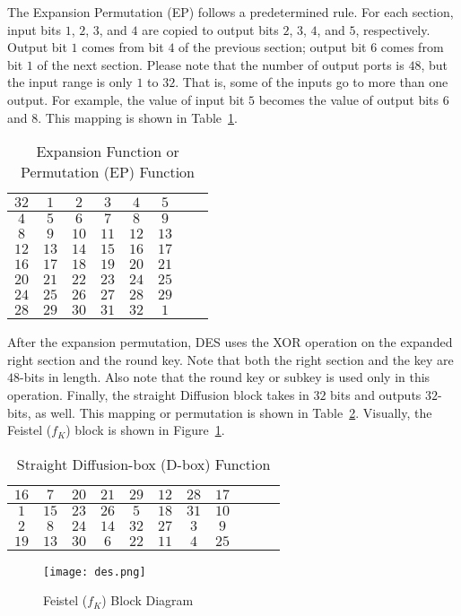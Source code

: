 \documentclass{article}
\begin{document}
The Expansion
Permutation (EP) follows a predetermined rule. For each
section, input bits $1$, $2$, $3$, and $4$ are copied to output
bits $2$, $3$, $4$, and $5$, respectively. Output bit $1$ comes
from bit $4$ of the previous section; output bit $6$ comes
from bit $1$ of the next section.
Please note that the number of output ports is $48$, but
the input range is only $1$ to $32$.
That is, some of the inputs go to more than one output.
For example, the value of input bit $5$ becomes the value of output
bits $6$ and $8$.  This mapping is shown in Table~\ref{ep.tbl}.  
\begin{table}
  \centering
  \begin{tabular} {|c|c|c|c|c|c|c|c|} \hline
    $32$ & $1$  & $2$  & $3$  & $4$  & $5$ \\ \hline
    $4$  & $5$  & $6$  & $7$  & $8$  & $9$ \\ \hline
    $8$  & $9$  & $10$ & $11$ & $12$ & $13$ \\ \hline
    $12$ & $13$ & $14$ & $15$ & $16$ & $17$ \\ \hline
    $16$ & $17$ & $18$ & $19$ & $20$ & $21$ \\ \hline        
    $20$ & $21$ & $22$ & $23$ & $24$ & $25$ \\ \hline
    $24$ & $25$ & $26$ & $27$ & $28$ & $29$ \\ \hline
    $28$ & $29$ & $30$ & $31$ & $32$ & $1$  \\ \hline        
\end{tabular}
\caption{Expansion Function or Permutation (EP) Function}
\label{ep.tbl}
\end{table}

After the expansion permutation, DES uses the XOR operation on the
expanded right section and the round key. Note that both the right
section and the key are $48$-bits in length. Also note that the round
key or subkey is used only in this operation.  Finally,
the straight Diffusion block
takes in $32$ bits and outputs $32$-bits, as well.  This mapping or
permutation is shown in Table~\ref{dbox.tbl}.  Visually, the Feistel
($f_K$) block is shown in Figure~\ref{des.png}. 
\begin{table}
  \centering
  \begin{tabular} {|c|c|c|c|c|c|c|c|c|c|c|} \hline
    $16$ & $7$  & $20$ & $21$ & $29$ & $12$ & $28$ & $17$ \\ \hline
    $1$  & $15$ & $23$ & $26$ & $5$  & $18$ & $31$ & $10$ \\ \hline
    $2$  & $8$  & $24$ & $14$ & $32$ & $27$ & $3$  & $9$  \\ \hline
    $19$ & $13$ & $30$ & $6$  & $22$ & $11$ & $4$  & $25$ \\ \hline    
\end{tabular}
\caption{Straight Diffusion-box (D-box) Function}
\label{dbox.tbl}
\end{table}
\begin{figure} [t!]
  \centering
  \texttt{[image: des.png]}
  \caption{Feistel ($f_K$) Block Diagram}
  \label{des.png}
\end{figure}
\end{document}
